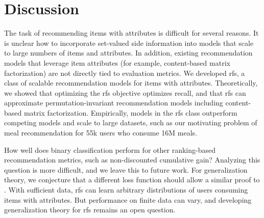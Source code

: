 \section{Discussion}
The task of recommending items with attributes is difficult for several reasons. It is unclear how to incorporate set-valued side information into models that scale to large numbers of items and attributes. In addition, existing recommendation models that leverage item attributes (for example, content-based matrix factorization) are not directly tied to evaluation metrics. We developed \gls{rfs}, a class of scalable recommendation models for items with attributes. Theoretically, we showed that optimizing the \gls{rfs} objective optimizes recall, and that \gls{rfs} can approximate permutation-invariant recommendation models including content-based matrix factorization. Empirically, models in the \gls{rfs} class outperform competing models and scale to large datasets, such as our motivating problem of meal recommendation for 55k users who consume 16M meals.

How well does binary classification perform for other ranking-based recommendation metrics, such as non-discounted cumulative gain? Analyzing this question is more difficult, and we leave this to future work. For generalization theory, we conjecture that a different loss function should allow a similar proof to . With sufficient data, \gls{rfs} can learn arbitrary distributions of users consuming items with attributes. But performance on finite data can vary, and developing generalization theory for \gls{rfs} remains an open question.



